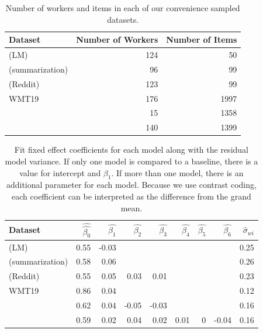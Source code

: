 \documentclass[11pt,a4paper]{article}
\begin{document}
\begin{table}[]
\centering \small
\begin{tabular}{lrr}
  \hline
 Dataset & Number of Workers & Number of Items \\ 
  \hline
    \citet{hashimoto2019unifying} (LM) & 124 & 50 \\ 
  \citet{hashimoto2019unifying} (summarization) & 96 & 99 \\ 
\citet{hashimoto2019unifying} (Reddit) & 123 & 99 \\ 
  WMT19 & 176 & 1997 \\ 
  \citet{dathathri.2020}  & 15 & 1358 \\ 
  \citet{holtzman.2020} & 140 & 1399 \\ 
   \hline
\end{tabular}
\caption{Number of workers and items in each of our convenience sampled datasets.}
\end{table}

\begin{table}[]
\centering \small
\begin{tabular}{lrrrrrrrr}
  \hline
Dataset & $\hat{\hat{\beta_{0}}}$ & $\hat{\beta_{1}}$ & $\hat{\beta_{2}}$ & $\hat{\beta_{3}}$ & $\hat{\beta_{4}}$ & $\hat{\beta_{5}}$ & $\hat{\beta_{6}}$ & $\hat{\sigma}_{wi}$ \\ 
  \hline
\citet{hashimoto2019unifying} (LM) & 0.55 & -0.03 &  &  &  &  &  & 0.25 \\ 
  \citet{hashimoto2019unifying} (summarization) & 0.58 & 0.06 &  &  &  &  &  & 0.26\\
    \citet{hashimoto2019unifying} (Reddit) & 0.55 & 0.05 & 0.03 & 0.01 &  &  &  & 0.23 \\ 
  WMT19 & 0.86 & 0.04 &  &  &  &  &  & 0.12 \\ 
  \citet{dathathri.2020}  & 0.62 & 0.04 & -0.05 & -0.03 &  &  &  & 0.16 \\ 
  \citet{holtzman.2020} & 0.59 & 0.02 & 0.04 & 0.02 & 0.01 & 0 & -0.04 & 0.16 \\ 
   \hline
\end{tabular}
\caption{Fit fixed effect coefficients for each model along with the residual model variance. If only one model is compared to a baseline, there is a value for intercept and $\beta_{1}$. If more than one model, there is an additional parameter for each model. Because we use contrast coding, each coefficient can be interpreted as the difference from the grand mean.} 
\label{table:fixef}
\end{table}
\end{document}

